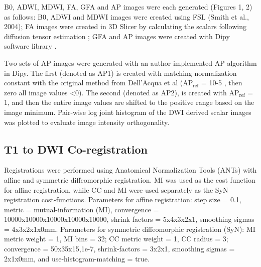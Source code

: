 B0, ADWI, MDWI, FA, GFA and AP images were each generated (Figures 1, 2) as follows: B0, ADWI and MDWI images were created using FSL (Smith et al., 2004); FA images were created in 3D Slicer by calculating the scalars following diffusion tensor estimation \cite{Pieper2006}; GFA and AP images were created with Dipy software library \cite{Descoteaux2007a,Garyfallidis2014}. 

Two sets of AP images were generated with an author-implemented AP algorithm in Dipy. The first (denoted as AP1) is created with matching normalization constant with the original method from Dell’Acqua et al \cite{DellAcqua2014} ($\text{AP}_{\text{ref}}$ = 10-5 , then zero all image values \textless 0). The second (denoted as AP2), is created with $\text{AP}_{\text{ref}}$ = 1, and then the entire image values are shifted to the positive range based on the image minimum. Pair-wise log joint histogram of the DWI derived scalar images was plotted \cite{Hunter2007} to evaluate image intensity orthogonality. 

\subsection{T1 to DWI Co-registration}
Registrations were performed using Anatomical Normalization Tools (ANTs) \cite{Avants2008b} with affine and symmetric diffeomorphic registration. MI was used as the cost function for affine registration, while CC and MI were used separately as the SyN registration cost-functions. Parameters for affine registration: step size = 0.1, metric = mutual-information (MI), convergence = 10000x10000x10000x10000x10000, shrink factors = 5x4x3x2x1, smoothing sigmas = 4x3x2x1x0mm. Parameters for symmetric diffeomorphic registration (SyN): MI metric weight = 1, MI bins = 32; CC metric weight = 1, CC radius = 3; convergence = 50x35x15,1e-7, shrink-factors = 3x2x1, smoothing sigmas = 2x1x0mm, and use-histogram-matching = true.

